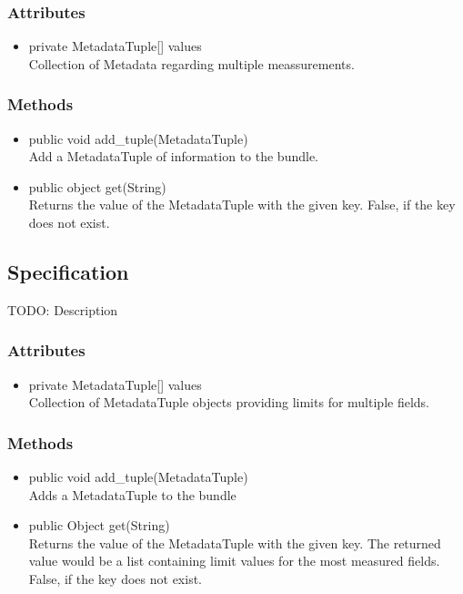 \subsubsection{Attributes}
\begin{itemize}
	\item private MetadataTuple[] values\\
	Collection of Metadata regarding multiple meassurements.
\end{itemize}
\subsubsection{Methods}
\begin{itemize}
	\item public void add_tuple(MetadataTuple)\\
	Add a MetadataTuple of information to the bundle.
	\item public object get(String)\\
	Returns the value of the MetadataTuple with the given key. False, if the key does not exist.
\end{itemize}


\subsection{Specification}
TODO: Description

\subsubsection{Attributes}
\begin{itemize}
	\item private MetadataTuple[] values\\
	Collection of MetadataTuple objects providing limits for multiple fields.
\end{itemize}
\subsubsection{Methods}
\begin{itemize}
	\item public void add_tuple(MetadataTuple)\\
	Adds a MetadataTuple to the bundle
	\item public Object get(String)\\
	Returns the value of the MetadataTuple with the given key. The returned value would be a list containing limit values for the most measured fields. False, if the key does not exist.
\end{itemize}



